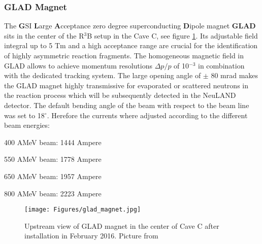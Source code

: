 \subsubsection{GLAD Magnet}
The \textbf{G}SI \textbf{L}arge \textbf{A}cceptance zero degree superconducting \textbf{D}ipole magnet \textbf{GLAD} sits in the center of the R$^3$B setup in the Cave C, see figure \ref{fig:GLAD}. Its adjustable field integral up to 5 Tm and a high acceptance range are crucial for the identification of highly asymmetric reaction fragments. The homogeneous magnetic field in GLAD allows to achieve momentum resolutions $\Delta p/p$ of 10$^{-3}$ in combination with the dedicated tracking system.\newline
The large opening angle of $\pm$ 80 mrad makes the GLAD magnet highly transmissive for evaporated or scattered neutrons in the reaction process which will be subsequently detected in the NeuLAND detector.\newline
The default bending angle of the beam with respect to the beam line was set to 18$^{\circ}$. Herefore the currents where adjusted according to the different beam energies:
\newenvironment{tight_enumerate}{
\begin{enumerate}
  \setlength{\itemsep}{0pt}
  \setlength{\parskip}{0pt}
}{\end{enumerate}}
\begin{tight_enumerate}
\item 400 AMeV beam: 1444 Ampere
\item 550 AMeV beam: 1778 Ampere
\item 650 AMeV beam: 1957 Ampere
\item 800 AMeV beam: 2223 Ampere
\end{tight_enumerate}
\begin{figure}[htpb]
    \centering
    \texttt{[image: Figures/glad\_magnet.jpg]}
    \caption{
    Upstream view of GLAD magnet in the center of Cave C after installation in February 2016. Picture from \cite{wiki:GLAD} 
    }
    \label{fig:GLAD}
\end{figure}
